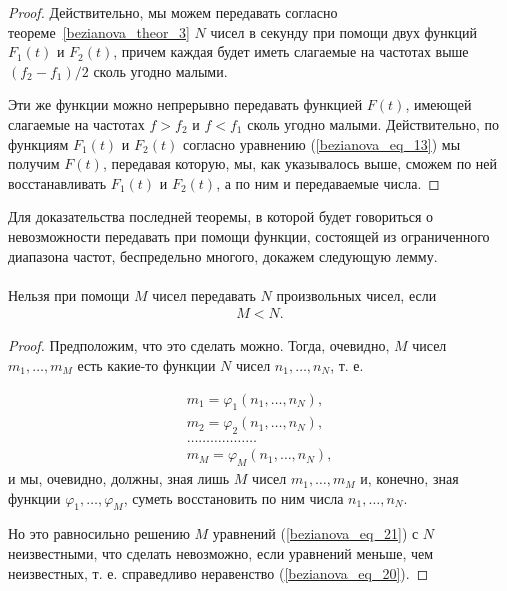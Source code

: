 \begin{proof}
Действительно, мы можем передавать согласно теореме~\ref{bezianova_theor_3} $N$ чисел в секунду при помощи двух функций $F_1(t)$ и $F_2(t)$, причем каждая будет иметь слагаемые на частотах выше $\left(f_2-f_1\right) / 2$ сколь угодно малыми.

Эти же функции можно непрерывно передавать функцией $F(t)$, имеющей слагаемые на частотах $f>f_2$ и $f<f_1$ сколь угодно малыми. Действительно, по функциям $F_1(t)$ и $F_2(t)$ согласно уравнению (\ref{bezianova_eq_13}) мы получим $F(t)$, передавая которую, мы, как указывалось выше, сможем по ней восстанавливать $F_1(t)$ и $F_2(t)$, а по ним и передаваемые числа.
\end{proof}
Для доказательства последней теоремы, в которой будет говориться о невозможности передавать при помощи функции, состоящей из ограниченного диапазона частот, беспредельно многого, докажем следующую лемму.

\paragraph{}

\begin{lemma}\label{bezianova_lemma_1} Нельзя при помощи $M$ чисел передавать $N$ произвольных чисел, если
\begin{equation}\label{bezianova_eq_20}
\begin{gathered}
M<N. 
\end{gathered}
\end{equation}
\end{lemma}

\begin{proof}
Предположим, что это сделать можно.
Тогда, очевидно, $M$ чисел $m_1, \ldots, m_M$ есть какие-то функции $N$ чисел $n_1, \ldots, n_N$, т. е.

\begin{equation}\label{bezianova_eq_21}
\begin{gathered}
m_1=\varphi_1\left(n_1, \ldots, n_N\right), \\
m_2=\varphi_2\left(n_1, \ldots, n_N\right), \\
\ldots\ldots\ldots\ldots\ldots\ldots \\
m_M=\varphi_M\left(n_1, \ldots, n_N\right), 
\end{gathered}
\end{equation}
и мы, очевидно, должны, зная лишь $M$ чисел $m_1, \ldots, m_M$ и, конечно, зная функции $\varphi_1, \ldots, \varphi_M$, суметь восстановить по ним числа $n_1, \ldots, n_N$.

Но это равносильно решению $M$ уравнений (\ref{bezianova_eq_21}) с $N$ неизвестными, что сделать невозможно, если уравнений меньше, чем неизвестных, т. е. справедливо неравенство (\ref{bezianova_eq_20}).
\end{proof}
